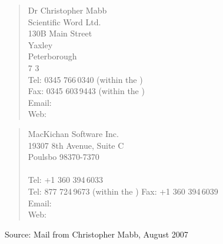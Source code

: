 \begin{description}
\begin{quote}
    Dr Christopher Mabb\\
    Scientific Word Ltd.\\
    130B Main Street\\
    Yaxley\\
    Peterborough\\
    7 3
    \\[0.25\baselineskip]
    Tel: 0345 766\,0340 (within the ) \\
    Fax: 0345 603\,9443 (within the ) \\
    Email:  \\
    Web: 
  \end{quote}
  \begin{quote}
    MacKichan Software Inc.\\
    19307 8th Avenue, Suite C\\
    Poulsbo  98370-7370\\
    \\[0.25\baselineskip]
    Tel: +1 360 394\,6033\\
    Tel: 877 724\,9673 (within the )
    Fax: +1  360 394\,6039\\
    Email: \\
    Web: 
  \end{quote}
  Source: Mail from Christopher Mabb, August 2007

\end{description}
